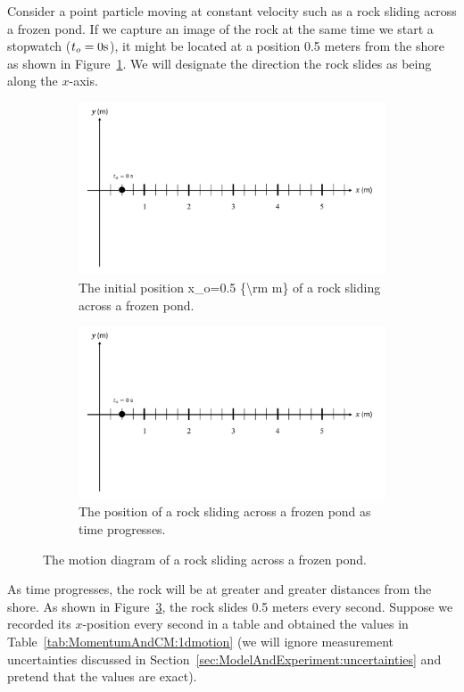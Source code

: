 Consider a point particle moving at constant velocity such as a rock sliding across a frozen pond. If we capture an image of the rock at the same time we start a stopwatch ($t_o = 0 {\rm s}$), it might be located at a position 0.5 meters from the shore as shown in Figure~\ref{fig:momentumandcm:constvelmotiona}. We will designate the direction the rock slides as being along the $x$-axis.

\begin{figure}[!htbp]
\centering
\begin{figure}[!htbp]
\centering
\includegraphics[width=0.7\linewidth]{files/ConstVelDotsa-bb1e54c58a33c4382d81aa1e636f3fb7.png}
\caption[]{The initial position x\_o=0.5 \{{\textbackslash}rm m\} of a rock sliding across a frozen pond.}
\label{fig:momentumandcm:constvelmotiona}
\end{figure}

\begin{figure}[!htbp]
\centering
\includegraphics[width=0.7\linewidth]{files/ConstVelDotsa-bb1e54c58a33c4382d81aa1e636f3fb7.png}
\caption[]{The position of a rock sliding across a frozen pond as time progresses.}
\label{fig:momentumandcm:constvelmotionb}
\end{figure}
\caption[]{The motion diagram of a rock sliding across a frozen pond.}
\label{fig:momentumandcm:constvelmotionb}
\end{figure}

As time progresses, the rock will be at greater and greater distances from the shore. As shown in Figure~\ref{fig:momentumandcm:constvelmotionb}, the rock slides 0.5 meters every second. Suppose we recorded its $x$-position every second in a table and obtained the values in Table~\ref{tab:MomentumAndCM:1dmotion} (we will ignore measurement uncertainties discussed in Section~\ref{sec:ModelAndExperiment:uncertainties} and pretend that the values are exact).


